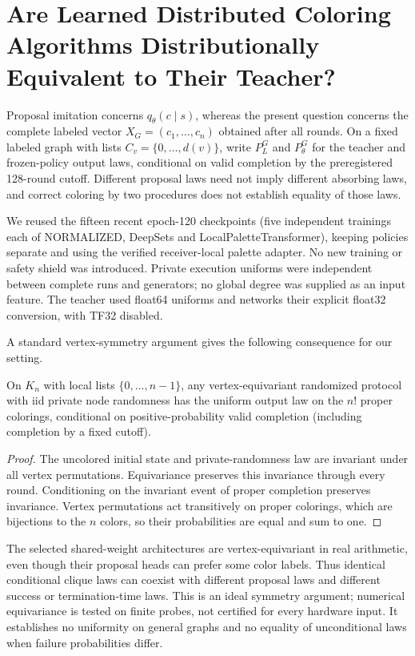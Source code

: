 \section{Are Learned Distributed Coloring Algorithms Distributionally Equivalent to Their Teacher?}
\label{sec:global-laws}
Proposal imitation concerns $q_\theta(c\mid s)$, whereas the present question
concerns the complete labeled vector $X_G=(c_1,\ldots,c_n)$ obtained after all
rounds. On a fixed labeled graph with lists $C_v=\{0,\ldots,d(v)\}$, write
$P_L^G$ and $P_\theta^G$ for the teacher and frozen-policy output laws,
conditional on valid completion by the preregistered 128-round cutoff.
Different proposal laws need not imply different absorbing laws, and correct
coloring by two procedures does not establish equality of those laws.

We reused the fifteen recent epoch-120 checkpoints (five independent
trainings each of NORMALIZED, DeepSets and LocalPaletteTransformer), keeping
policies separate and using the verified receiver-local palette adapter.
No new training or safety shield was introduced. Private execution uniforms
were independent between complete runs and generators; no global degree
was supplied as an input feature. The teacher used float64 uniforms and
networks their explicit float32 conversion, with TF32 disabled.

A standard vertex-symmetry argument gives the following consequence for our setting.
\begin{proposition}
On $K_n$ with local lists $\{0,\ldots,n-1\}$, any vertex-equivariant
randomized protocol with iid private node randomness has the uniform output
law on the $n!$ proper colorings, conditional on positive-probability valid
completion (including completion by a fixed cutoff).
\end{proposition}
\begin{proof}
The uncolored initial state and private-randomness law are invariant under
all vertex permutations. Equivariance preserves this invariance through
every round. Conditioning on the invariant event of proper completion
preserves invariance. Vertex permutations act transitively on proper
colorings, which are bijections to the $n$ colors, so their probabilities
are equal and sum to one.
\end{proof}
The selected shared-weight architectures are vertex-equivariant in real
arithmetic, even though their proposal heads can prefer some color labels.
Thus identical conditional clique laws can coexist with different proposal
laws and different success or termination-time laws. This is an ideal
symmetry argument; numerical equivariance is tested on finite probes, not
certified for every hardware input. It establishes no uniformity on general
graphs and no equality of unconditional laws when failure probabilities differ.

